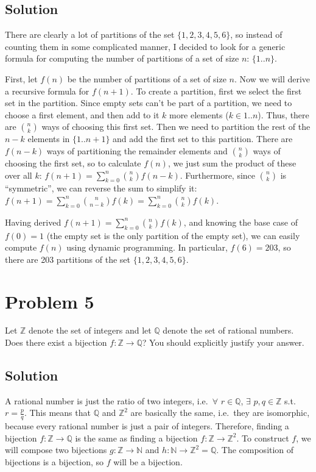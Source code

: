 \documentclass[fleqn]{article}
\begin{document}
        \subsection{Solution}
        There are clearly a lot of partitions of the set $\{1, 2, 3, 4, 5, 6\}$, so instead of counting them in some complicated manner, I decided to look for a generic formula for computing the number of partitions of a set of size $n$: $\{1..n\}$.
        
        First, let $f(n)$ be the number of partitions of a set of size $n$.  Now we will derive a recursive formula for $f(n + 1)$.  To create a partition, first we select the first set in the partition.  Since empty sets can't be part of a partition, we need to choose a first element, and then add to it $k$ more elements ($k \in 1..n$).  Thus, there are $\binom{n}{k}$ ways of choosing this first set.  Then we need to partition the rest of the $n - k$ elements in $\{1..n + 1\}$ and add the first set to this partition.  There are $f(n - k)$ ways of partitioning the remainder elements and $\binom{n}{k}$ ways of choosing the first set, so to calculate $f(n)$, we just sum the product of these over all $k$: $f(n + 1) = \sum\limits_{k = 0}^{n} \binom{n}{k} f(n - k)$.  Furthermore, since $\binom{n}{k}$ is ``symmetric'', we can reverse the sum to simplify it: $f(n + 1) = \sum\limits_{k = 0}^{n} \binom{n}{n - k} f(k) = \sum\limits_{k = 0}^{n} \binom{n}{k} f(k)$.
        
        Having derived $f(n + 1) = \sum\limits_{k = 0}^{n} \binom{n}{k} f(k)$, and knowing the base case of $f(0) = 1$ (the empty set is the only partition of the empty set), we can easily compute $f(n)$ using dynamic programming.  In particular, $f(6) = 203$, so there are 203 partitions of the set $\{1, 2, 3, 4, 5, 6\}$.
        
    \section{Problem 5}
    Let $\mathbb{Z}$ denote the set of integers and let $\mathbb{Q}$ denote the set of rational numbers.  Does there exist a bijection $f: \mathbb{Z} \to \mathbb{Q}$?  You should explicitly justify your answer.
        
        \subsection{Solution}
        A rational number is just the ratio of two integers, i.e.\ $\forall$ $r \in \mathbb{Q}$, $\exists$ $p, q \in \mathbb{Z}$ s.t.\ $r = \frac{p}{q}$.  This means that $\mathbb{Q}$ and $\mathbb{Z}^2$ are basically the same, i.e.\ they are isomorphic, because every rational number is just a pair of integers.  Therefore, finding a bijection $f: \mathbb{Z} \to \mathbb{Q}$ is the same as finding a bijection $f: \mathbb{Z} \to \mathbb{Z}^2$.  To construct $f$, we will compose two bijections $g: \mathbb{Z} \to \mathbb{N}$ and $h: \mathbb{N} \to \mathbb{Z}^2 = \mathbb{Q}$.  The composition of bijections is a bijection, so $f$ will be a bijection.
        
\end{document}
